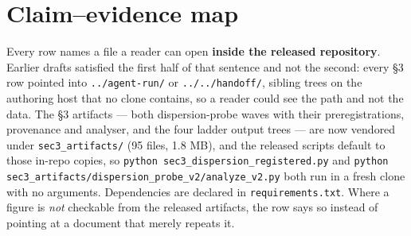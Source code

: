 ﻿\section*{Claim--evidence map}

Every row names a file a reader can open \textbf{inside the released repository}. Earlier drafts satisfied the first half of that sentence and not the second: every \S3 row pointed into \texttt{../agent-run/} or \texttt{../../handoff/}, sibling trees on the authoring host that no clone contains, so a reader could see the path and not the data. The \S3 artifacts --- both dispersion-probe waves with their preregistrations, provenance and analyser, and the four ladder output trees --- are now vendored under \texttt{sec3\_artifacts/} (95 files, 1.8 MB), and the released scripts default to those in-repo copies, so \texttt{python sec3\_dispersion\_registered.py} and \texttt{python sec3\_\bk{}artifacts/\bk{}dispersion\_\bk{}probe\_\bk{}v2/\bk{}analyze\_\bk{}v2.py} both run in a fresh clone with no arguments. Dependencies are declared in \texttt{requirements.txt}. Where a figure is \emph{not} checkable from the released artifacts, the row says so instead of pointing at a document that merely repeats it.

